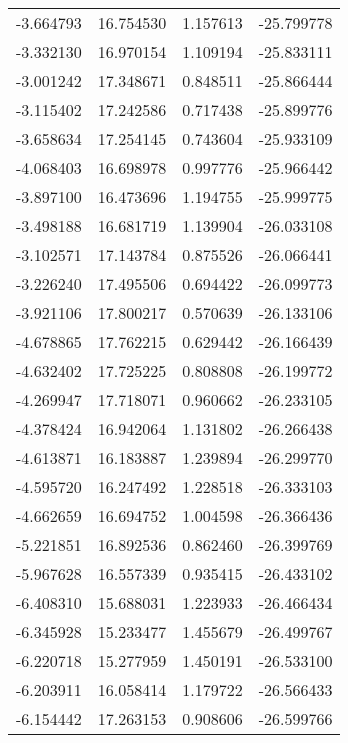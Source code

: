 \begin{tabular}{rrrr}
       -3.664793 &        16.754530 &    1.157613 & -25.799778 \\
       -3.332130 &        16.970154 &    1.109194 & -25.833111 \\
       -3.001242 &        17.348671 &    0.848511 & -25.866444 \\
       -3.115402 &        17.242586 &    0.717438 & -25.899776 \\
       -3.658634 &        17.254145 &    0.743604 & -25.933109 \\
       -4.068403 &        16.698978 &    0.997776 & -25.966442 \\
       -3.897100 &        16.473696 &    1.194755 & -25.999775 \\
       -3.498188 &        16.681719 &    1.139904 & -26.033108 \\
       -3.102571 &        17.143784 &    0.875526 & -26.066441 \\
       -3.226240 &        17.495506 &    0.694422 & -26.099773 \\
       -3.921106 &        17.800217 &    0.570639 & -26.133106 \\
       -4.678865 &        17.762215 &    0.629442 & -26.166439 \\
       -4.632402 &        17.725225 &    0.808808 & -26.199772 \\
       -4.269947 &        17.718071 &    0.960662 & -26.233105 \\
       -4.378424 &        16.942064 &    1.131802 & -26.266438 \\
       -4.613871 &        16.183887 &    1.239894 & -26.299770 \\
       -4.595720 &        16.247492 &    1.228518 & -26.333103 \\
       -4.662659 &        16.694752 &    1.004598 & -26.366436 \\
       -5.221851 &        16.892536 &    0.862460 & -26.399769 \\
       -5.967628 &        16.557339 &    0.935415 & -26.433102 \\
       -6.408310 &        15.688031 &    1.223933 & -26.466434 \\
       -6.345928 &        15.233477 &    1.455679 & -26.499767 \\
       -6.220718 &        15.277959 &    1.450191 & -26.533100 \\
       -6.203911 &        16.058414 &    1.179722 & -26.566433 \\
       -6.154442 &        17.263153 &    0.908606 & -26.599766 \\

\end{tabular}
